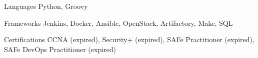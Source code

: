 
\begin{cvskills}
  \cvskill
    {Languages} %
    {Python, Groovy} %

  \cvskill
    {Frameworks} %
    {
        Jenkins,
        Docker,
        Ansible,
        OpenStack,
        Artifactory,
        Make,
        SQL
    } %

  \cvskill
    {Certifications}
    {CCNA (expired), Security+ (expired), SAFe Practitioner (expired), SAFe DevOps Practitioner (expired)}

\end{cvskills}

